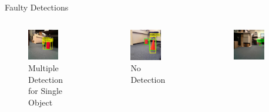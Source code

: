 \documentclass[10pt]{beamer}
\begin{document}
\begin{frame}{Faulty Detections}
\begin{columns}
\begin{figure}
         \includegraphics[width=0.7\textwidth]{Images/ft3.png}
         \caption{Multiple Detection for Single Object}
     \end{figure}
     \vspace{-20pt}
     \begin{figure}
         \centering
         \includegraphics[width=0.7\textwidth]{Images/ft4.png}
         \caption{No Detection}
     \end{figure}
     \begin{figure}
         \centering
         \includegraphics[width=0.7\textwidth]{Images/ft5.png}

\end{figure}
\end{columns}
\end{frame}
\end{document}
